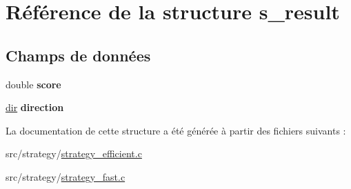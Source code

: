 \hypertarget{structs__result}{
\section{Référence de la structure s\_\-result}
\label{structs__result}
}
\subsection*{Champs de données}
\begin{DoxyCompactItemize}
\item 
\hypertarget{structs__result_a40a24ec85daa9ac70aa74e4ca744f838}{
double {\bfseries score}}
\label{structs__result_a40a24ec85daa9ac70aa74e4ca744f838}

\item 
\hypertarget{structs__result_af38e64cfffd4190801bd8aa25f3f60af}{
\hyperlink{grid_8h_a862c63b15eab5b0d2781cea356e5d935}{dir} {\bfseries direction}}
\label{structs__result_af38e64cfffd4190801bd8aa25f3f60af}

\end{DoxyCompactItemize}


La documentation de cette structure a été générée à partir des fichiers suivants :\begin{DoxyCompactItemize}
\item 
src/strategy/\hyperlink{strategy__efficient_8c}{strategy\_\-efficient.c}\item 
src/strategy/\hyperlink{strategy__fast_8c}{strategy\_\-fast.c}\end{DoxyCompactItemize}

